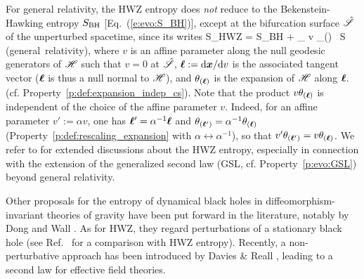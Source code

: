 For general relativity, the HWZ entropy does \emph{not} reduce to the
Bekenstein-Hawking entropy $S_{\rm BH}$ [Eq.~(\ref{e:evo:S_BH})], except
at the bifurcation surface $\hat{\mathscr{S}}$ of the unperturbed spacetime, since its writes
\be
    S_{\rm HWZ} = S_{\rm BH} + 
        \int_{\Sp} v \theta_{(\wl)} \, \D S  \qquad \mbox{(general relativity)},
\ee
where $v$ is an affine parameter along the null geodesic generators of $\mathscr{H}$
such that $v=0$ at $\hat{\mathscr{S}}$,
$\bm{\ell} := \mathrm{d}\bm{x}/\mathrm{d} v$ is the associated tangent vector ($\bm{\ell}$ is thus a null normal to $\mathscr{H}$),
and $\theta_{(\bm{\ell})}$ is the expansion of $\mathscr{H}$ along $\bm{\ell}$.
(cf. Property~\ref{p:def:expansion_indep_cs}). Note that the product
$v \theta_{(\bm{\ell})}$ is independent of the choice of the affine parameter $v$.
Indeed, for an affine parameter $v' := \alpha v$, one has $\bm{\ell}' = \alpha^{-1}  \bm{\ell}$ and
$\theta_{(\bm{\ell}')} = \alpha^{-1} \theta_{(\bm{\ell})}$ (Property~\ref{p:def:rescaling_expansion}
with $\alpha\leftrightarrow \alpha^{-1}$), so that $v' \theta_{(\bm{\ell}')} = v \theta_{(\bm{\ell})}$.
We refer to \cite{Wald24,VisseY24} for extended discussions about the HWZ entropy, especially
in connection with the extension of the generalized second law (GSL, cf. Property~\ref{p:evo:GSL}) beyond general relativity.

Other proposals for the entropy of dynamical black holes in diffeomorphism-invariant
theories of gravity have been put forward in the literature, notably by
Dong \cite{Dong14} and Wall \cite{Wall15}. As for HWZ, they regard perturbations
of a stationary black hole (see Ref.~\cite{HollaWZ24,VisseY24} for a
comparison with HWZ entropy).
Recently, a non-perturbative approach has been
introduced by Davies \& Reall \cite{DavieR24}, leading to a second law
for effective field theories.



